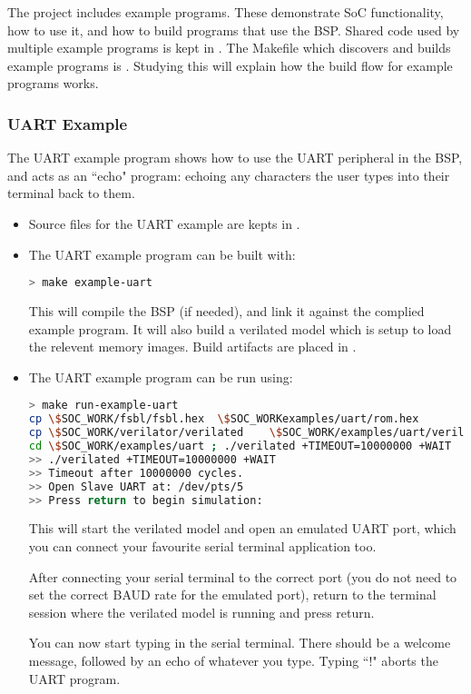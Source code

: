 
%

The project includes example programs.
These demonstrate SoC functionality, how to use it, and how to
build programs that use the \SCARVSOC BSP.
Shared code used by multiple example programs is kept in
.
The Makefile which discovers and builds example programs is
.
Studying this will explain how the build flow for example programs
works.

\subsubsection{UART Example}

The UART example program shows how to use the UART peripheral in
the BSP, and acts as an ``echo" program: echoing any characters the
user types into their terminal back to them.

\begin{itemize}

\item Source files for the UART example are kepts in
    .

\item The UART example program can be built with:

\begin{lstlisting}[language=bash,style=block]
> make example-uart
\end{lstlisting}

    This will compile the BSP (if needed), and link it against the
    complied example program.
    It will also build a verilated model which is setup to load the
    relevent memory images.
    Build artifacts are placed in
    .

\item The UART example program can be run using:

\begin{lstlisting}[language=bash,style=block]
> make run-example-uart
cp \$SOC_WORK/fsbl/fsbl.hex  \$SOC_WORKexamples/uart/rom.hex
cp \$SOC_WORK/verilator/verilated    \$SOC_WORK/examples/uart/verilated
cd \$SOC_WORK/examples/uart ; ./verilated +TIMEOUT=10000000 +WAIT
>> ./verilated +TIMEOUT=10000000 +WAIT
>> Timeout after 10000000 cycles.
>> Open Slave UART at: /dev/pts/5
>> Press return to begin simulation:
\end{lstlisting}

    This will start the verilated model and open an emulated UART
    port, which you can connect your favourite serial terminal application
    too.

    After connecting your serial terminal to the correct port (you do
    not need to set the correct BAUD rate for the emulated port), return
    to the terminal session where the verilated model is running and
    press return.

    You can now start typing in the serial terminal.
    There should be a welcome message, followed by an echo of whatever
    you type.
    Typing ``!" aborts the UART program.

\end{itemize}

